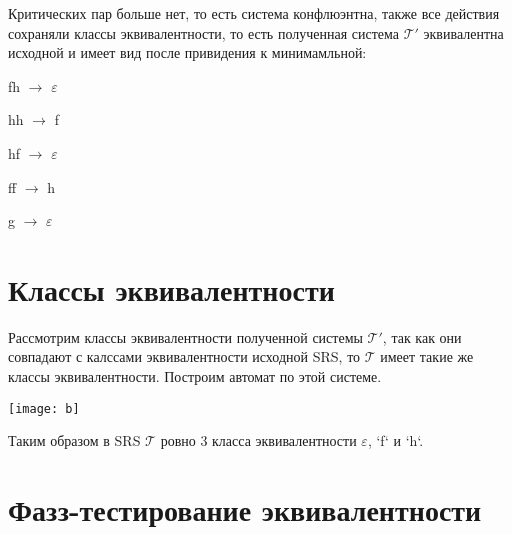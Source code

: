 \documentclass[a4paper, 14pt]{extarticle}
\begin{document}
Критических пар больше нет, то есть система конфлюэнтна, также все действия сохраняли классы эквивалентности, то есть полученная система $\mathcal{T}'$ эквивалентна исходной и имеет вид после привидения к минимамльной:

fh $\rightarrow$ $\varepsilon$

hh $\rightarrow$ f

hf $\rightarrow$ $\varepsilon$

ff $\rightarrow$ h

g $\rightarrow$ $\varepsilon$

\section{Классы эквивалентности}

Рассмотрим классы эквивалентности полученной системы $\mathcal{T}'$, так как они совпадают с калссами эквивалентности исходной SRS, то $\mathcal{T}$ имеет такие же классы эквивалентности. Построим автомат по этой системе.

\begin{center}
\texttt{[image: b]}
\end{center}

Таким образом в SRS $\mathcal{T}$ ровно 3 класса эквивалентности $\varepsilon$, `f` и `h`.

\section{Фазз-тестирование эквивалентности}
\end{document}
